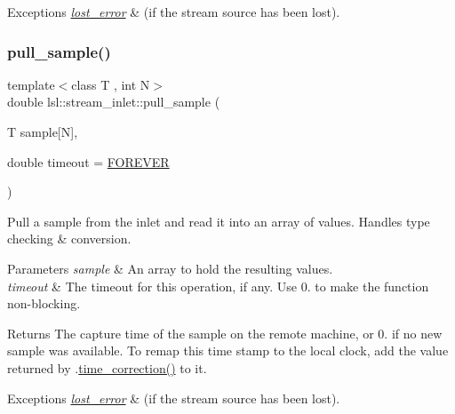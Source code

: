 \begin{DoxyExceptions}{Exceptions}
{\em \hyperlink{classlsl_1_1lost__error}{lost\+\_\+error}} & (if the stream source has been lost). \\
\hline
\end{DoxyExceptions}
\mbox{\label{classlsl_1_1stream__inlet_a58dc91be6ec0d1b83024a169ad0c292b}} 
\subsubsection{\texorpdfstring{pull\+\_\+sample()}{pull\_sample()}\hspace{0.1cm}{\footnotesize\ttfamily [1/3]}}
{\footnotesize\ttfamily template$<$class T , int N$>$ \\
double lsl\+::stream\+\_\+inlet\+::pull\+\_\+sample (\begin{DoxyParamCaption}\item[{T}]{sample\mbox{[}\+N\mbox{]},  }\item[{double}]{timeout = {\ttfamily \hyperlink{namespacelsl_a74cfbc9077aca21295117217249721ed}{F\+O\+R\+E\+V\+ER}} }\end{DoxyParamCaption})\hspace{0.3cm}{\ttfamily [inline]}}

Pull a sample from the inlet and read it into an array of values. Handles type checking \& conversion. 
\begin{DoxyParams}{Parameters}
{\em sample} & An array to hold the resulting values. \\
\hline
{\em timeout} & The timeout for this operation, if any. Use 0. to make the function non-\/blocking. \\
\hline
\end{DoxyParams}
\begin{DoxyReturn}{Returns}
The capture time of the sample on the remote machine, or 0. if no new sample was available. To remap this time stamp to the local clock, add the value returned by .\hyperlink{classlsl_1_1stream__inlet_a845d95f5fc60fb9cd01fb73d3da75e94}{time\+\_\+correction()} to it. 
\end{DoxyReturn}

\begin{DoxyExceptions}{Exceptions}
{\em \hyperlink{classlsl_1_1lost__error}{lost\+\_\+error}} & (if the stream source has been lost). \\
\hline
\end{DoxyExceptions}
\mbox{\label{classlsl_1_1stream__inlet_af3707fbfd5e9f54be73f9d55de55a8fc}} 
